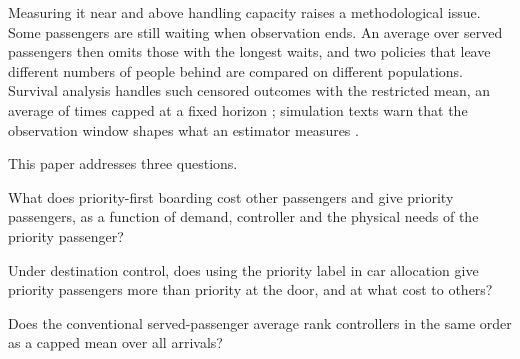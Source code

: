\documentclass[12pt,a4paper]{article}
\begin{document}
Measuring it near and above handling capacity raises a methodological issue. Some passengers are still waiting when observation ends. An average over served passengers then omits those with the longest waits, and two policies that leave different numbers of people behind are compared on different populations. Survival analysis handles such censored outcomes with the restricted mean, an average of times capped at a fixed horizon \cite{royston2013}; simulation texts warn that the observation window shapes what an estimator measures \cite{law2015}.

This paper addresses three questions.
\begin{description}[leftmargin=2.2em,style=nextline,itemsep=1pt]
\item[Q1] What does priority-first boarding cost other passengers and give priority passengers, as a function of demand, controller and the physical needs of the priority passenger?
\item[Q2] Under destination control, does using the priority label in car allocation give priority passengers more than priority at the door, and at what cost to others?
\item[Q3] Does the conventional served-passenger average rank controllers in the same order as a capped mean over all arrivals?
\end{description}
\end{document}
